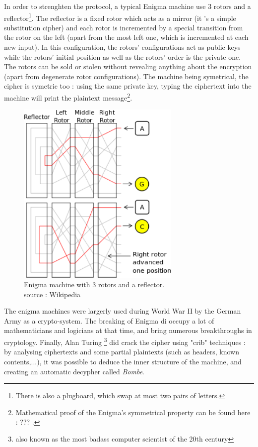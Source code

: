 In order to strenghten the protocol, a typical Enigma machine use 3 rotors and a reflector\footnote{There is also a plugboard, which swap at most two pairs of letters.}. The reflector is a fixed rotor which acts as a mirror (it 's a simple substitution cipher) and each rotor is incremented by a special transition from the rotor on the left (apart from the most left one, which is incremented at each new input). In this configuration, the rotors' configurations act as public keys while the rotors' initial position as well as the rotors' order is the private one. The rotors can be sold or stolen without revealing anything about the encryption (apart from degenerate rotor configurations). The machine being symetrical, the cipher is symetric too : using the same private key, typing the ciphertext into the machine will print the plaintext message\footnote{Mathematical proof of the Enigma's symmetrical property can be found here : ??? .}.


\begin{figure}[ht!]
    \centering
        \includegraphics[width=0.7\textwidth]{images/Enigma_3rotors}
    \caption{ Enigma machine with 3 rotors and a reflector.\\ source : Wikipedia}
	\label{fig:enigma_3rotors}
\end{figure}

The enigma machines were largerly used during World War II by the German Army as a crypto-system. The breaking of Enigma di occupy a lot of mathematicians and logicians at that time, and bring numerous breakthroughs in cryptology. Finally, Alan Turing \footnote{also known as the most badass computer scientist of the 20th century} did crack the cipher using "crib" techniques : by analysing ciphertexts and some partial plaintexts (such as headers, known contents,...), it was possible to deduce the inner structure of the machine, and creating an automatic decypher called \emph{Bombe}.






